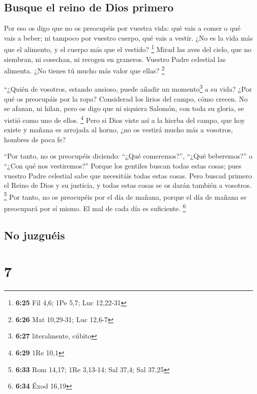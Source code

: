 \hypertarget{busque-el-reino-de-dios-primero}{%
\subsection{Busque el reino de Dios
primero}\label{busque-el-reino-de-dios-primero}}

 Por eso os digo que no os preocupéis por vuestra vida:
qué vais a comer o qué vais a beber; ni tampoco por vuestro cuerpo, qué
vais a vestir. ¿No es la vida más que el alimento, y el cuerpo más que
el vestido? \footnote{\textbf{6:25} Fil 4,6; 1Pe 5,7; Luc 12,22-31}
 Mirad las aves del cielo, que no siembran, ni cosechan,
ni recogen en graneros. Vuestro Padre celestial las alimenta. ¿No tienes
tú mucho más valor que ellas? \footnote{\textbf{6:26} Mat 10,29-31; Luc
  12,6-7}

 ``¿Quién de vosotros, estando ansioso, puede añadir un
momento\footnote{\textbf{6:27} literalmente, cúbito} a su vida?
 ¿Por qué os preocupáis por la ropa? Considerad los
lirios del campo, cómo crecen. No se afanan, ni hilan, 
pero os digo que ni siquiera Salomón, con toda su gloria, se vistió como
uno de ellos. \footnote{\textbf{6:29} 1Re 10,1}  Pero si
Dios viste así a la hierba del campo, que hoy existe y mañana es
arrojada al horno, ¿no os vestirá mucho más a vosotros, hombres de poca
fe?

 ``Por tanto, no os preocupéis diciendo: ``¿Qué
comeremos?'', ``¿Qué beberemos?'' o ``¿Con qué nos vestiremos?''
 Porque los gentiles buscan todas estas cosas; pues
vuestro Padre celestial sabe que necesitáis todas estas cosas.
 Pero buscad primero el Reino de Dios y su justicia, y
todas estas cosas se os darán también a vosotros. \footnote{\textbf{6:33}
  Rom 14,17; 1Re 3,13-14; Sal 37,4; Sal 37,25}  Por
tanto, no os preocupéis por el día de mañana, porque el día de mañana se
preocupará por sí mismo. El mal de cada día es suficiente. \footnote{\textbf{6:34}
  Éxod 16,19}

\hypertarget{no-juzguuxe9is}{%
\subsection{No juzguéis}\label{no-juzguuxe9is}}

\hypertarget{section-6}{%
\section{7}\label{section-6}}

